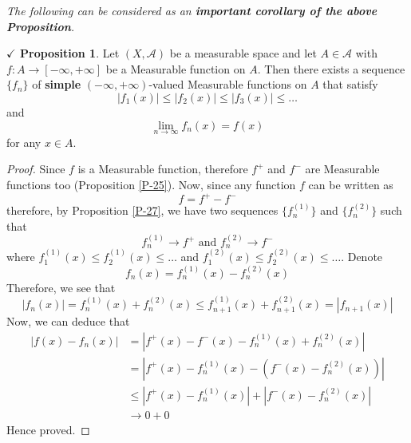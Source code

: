 \documentclass{article}
\theoremstyle{definition}
\theoremstyle{remark}
\theoremstyle{definition}
\theoremstyle{definition}
\newtheorem{proposition}{$\checkmark$ Proposition}
\theoremstyle{definition}
\newcommand{\abs}[1]{\left \vert #1\right \vert}
\newcommand{\alg}[1]{\mathscr{#1}}
\begin{document}
\emph{The following can be considered as an\textbf{ important corollary of the above Proposition}.}
\begin{proposition}
	Let $ (X,\alg{A}) $ be a measurable space and let $ A \in \alg{A} $ with $ f :A\to[-\infty	,+\infty] $ be a Measurable function on $ A $. Then there exists a sequence $ \{f_n\} $ of \textbf{simple} $ (-\infty,+\infty) $-valued Measurable functions on $ A $ that satisfy 
	\[\abs{f_1(x)}\le \abs{f_2(x)}\le \abs{f_3(x)}\le \dots\]
	and 
	\[\lim_{n\to\infty } f_{n}(x) = f(x)\]
	for any $ x\in A $.
\end{proposition}
\begin{proof}
	 	Since $ f $ is a Measurable function, therefore $ f^{+} $ and $ f^{-} $ are Measurable functions too (Proposition \ref{P-25}). Now, since any function $ f $ can be written as 
	 	\[f = f^{+} - f^{-}\]
	 	therefore, by Proposition \ref{P-27}, we have two sequences $ \{f_n^{(1)}\} $ and $ \{f_n^{(2)}\} $ such that
	 	\[f_n^{(1)}\longrightarrow f^{+}\text{ and }f_n^{(2)}\longrightarrow f^{-}\]
		where $ f_1^{(1)}(x) \le f_2^{(1)}(x)\le \dots $ and $f_1^{(2)}(x) \le f_2^{(2)}(x) \le \dots $. Denote 
		\[f_n(x) = f_n^{(1)}(x) - f_n^{(2)}(x) \]
		Therefore, we see that
		 \[\abs{f_n(x)} = f_n^{(1)}(x) + f_n^{(2)}(x) \le f_{n+1}^{(1)}(x) + f_{n+1}^{(2)}(x) = \abs{f_{n+1}(x)}\]
		Now, we can deduce that
		\begin{equation*}
			\begin{split}
				\abs{f(x) - f_n(x)} &= \abs{f^{+}(x) - f^{-}(x) - f_n^{(1)}(x) + f_n^{(2)}(x) }\\
				&= \abs{f^{+}(x) - f_n^{(1)}(x) - \left (f^{-}(x) - f_n^{(2)}(x)\right )}\\
				&\le  \abs{f^{+}(x) - f_n^{(1)}(x)} + \abs{f^{-}(x) - f_n^{(2)}(x)}\\
				&\to 0 + 0
			\end{split}
		\end{equation*}
	Hence proved.
\end{proof}
\hrulefill
\newpage
\end{document}
